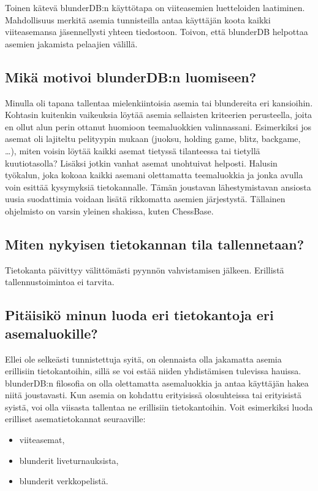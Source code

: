 \documentclass[letterpaper,10pt,finnish]{sphinxmanual}
\begin{document}
\sphinxAtStartPar
Toinen kätevä blunderDB:n käyttötapa on viiteasemien luetteloiden laatiminen. Mahdollisuus merkitä asemia tunnisteilla antaa käyttäjän koota kaikki viiteasemansa jäsennellysti yhteen tiedostoon. Toivon, että blunderDB helpottaa asemien jakamista pelaajien välillä.


\subsection{Mikä motivoi blunderDB:n luomiseen?}
\label{\detokenize{faq:qu-est-ce-qui-a-motive-la-creation-de-blunderdb}}
\sphinxAtStartPar
Minulla oli tapana tallentaa mielenkiintoisia asemia tai blundereita eri kansioihin. Kohtasin kuitenkin vaikeuksia löytää asemia sellaisten kriteerien perusteella, joita en ollut alun perin ottanut huomioon teemaluokkien valinnassani. Esimerkiksi jos asemat oli lajiteltu pelityypin mukaan (juoksu, holding game, blitz, backgame, …), miten voisin löytää kaikki asemat tietyssä tilanteessa tai tietyllä kuutiotasolla? Lisäksi jotkin vanhat asemat unohtuivat helposti. Halusin työkalun, joka kokoaa kaikki asemani olettamatta teemaluokkia  ja jonka avulla voin esittää kysymyksiä tietokannalle. Tämän joustavan lähestymistavan ansiosta uusia suodattimia voidaan lisätä rikkomatta asemien järjestystä. Tällainen ohjelmisto on varsin yleinen shakissa, kuten ChessBase.


\subsection{Miten nykyisen tietokannan tila tallennetaan?}
\label{\detokenize{faq:comment-sauvegarder-la-base-de-donnees-courante}}
\sphinxAtStartPar
Tietokanta päivittyy välittömästi pyynnön vahvistamisen jälkeen. Erillistä tallennustoimintoa ei tarvita.


\subsection{Pitäisikö minun luoda eri tietokantoja eri asemaluokille?}
\label{\detokenize{faq:dois-je-creer-differentes-bases-de-donnees-pour-differentes-categories-de-positions}}
\sphinxAtStartPar
Ellei ole selkeästi tunnistettuja syitä, on olennaista olla jakamatta asemia erillisiin tietokantoihin, sillä se voi estää niiden yhdistämisen tulevissa hauissa. blunderDB:n filosofia on olla olettamatta asemaluokkia  ja antaa käyttäjän hakea niitä joustavasti. Kun asemia on kohdattu erityisissä olosuhteissa tai erityisistä syistä, voi olla viisasta tallentaa ne erillisiin tietokantoihin. Voit esimerkiksi luoda erilliset asematietokannat seuraaville:
\begin{itemize}
\item {} 
\sphinxAtStartPar
viiteasemat,

\item {} 
\sphinxAtStartPar
blunderit live\sphinxhyphen{}turnauksista,

\item {} 
\sphinxAtStartPar
blunderit verkkopelistä.

\end{itemize}
\end{document}
